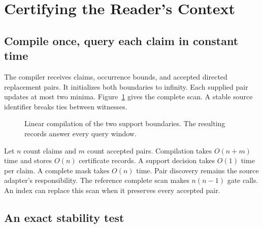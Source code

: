 \section{Certifying the Reader's Context}
\label{sec:method}

\subsection{Compile once, query each claim in constant time}

The compiler receives claims, occurrence bounds, and accepted directed replacement pairs.
It initializes both boundaries to infinity.
Each supplied pair updates at most two minima.
Figure~\ref{fig:compiler} gives the complete scan.
A stable source identifier breaks ties between witnesses.

\begin{figure}[t]
\centering
{}
\caption{Linear compilation of the two support boundaries. The resulting records answer every query window.}
\label{fig:compiler}
\end{figure}

Let $n$ count claims and $m$ count accepted pairs.
Compilation takes $O(n+m)$ time and stores $O(n)$ certificate records.
A support decision takes $O(1)$ time per claim.
A complete mask takes $O(n)$ time.
Pair discovery remains the source adapter's responsibility.
The reference complete scan makes $n(n-1)$ gate calls.
An index can replace this scan when it preserves every accepted pair.

\subsection{An exact stability test}

